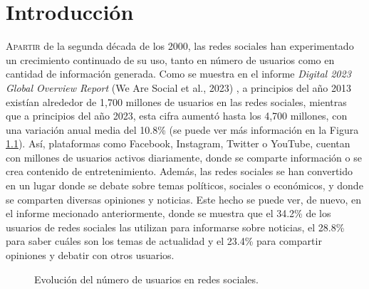 \chapter{Introducción}
\label{chap:introduccion}

\lettrine{A}{partir} de la segunda década de los 2000, las redes sociales han experimentado
un crecimiento continuado de su uso, tanto en número de usuarios como en
cantidad de información generada. Como se muestra en el informe \textit{Digital 2023 Global Overview Report} (We Are Social et al., 2023)
\cite{wearesocial}, a principios del año 2013 existían alrededor de 1,700 millones de usuarios en las redes sociales,
mientras que a principios del año 2023, esta cifra aumentó hasta los 4,700 millones, con una variación anual media del 10.8\% (se puede ver
más información en la Figura \ref{fig:usuarios_redes_sociales}).
Así, plataformas como Facebook, Instagram, Twitter o YouTube, cuentan con millones de usuarios activos diariamente,
donde se comparte información o se crea contenido de entretenimiento. Además, las redes sociales se han convertido en
un lugar donde se debate sobre temas políticos, sociales o económicos, y donde se comparten diversas opiniones y noticias.
Este hecho se puede ver, de nuevo, en el informe mecionado anteriormente, donde se muestra que el 34.2\% de los usuarios
de redes sociales las utilizan para informarse sobre noticias, el 28.8\% para saber cuáles son los temas de actualidad
y el 23.4\% para compartir opiniones y debatir con otros usuarios.

\bigskip
\begin{figure}[H]
	\centering
	\caption{Evolución del número de usuarios en redes sociales.}
	\label{fig:usuarios_redes_sociales}
\end{figure}

